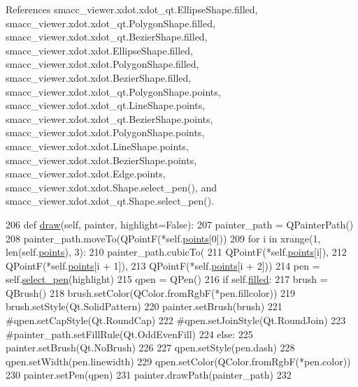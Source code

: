 References smacc\+\_\+viewer.\+xdot.\+xdot\+\_\+qt.\+Ellipse\+Shape.\+filled, smacc\+\_\+viewer.\+xdot.\+xdot\+\_\+qt.\+Polygon\+Shape.\+filled, smacc\+\_\+viewer.\+xdot.\+xdot\+\_\+qt.\+Bezier\+Shape.\+filled, smacc\+\_\+viewer.\+xdot.\+xdot.\+Ellipse\+Shape.\+filled, smacc\+\_\+viewer.\+xdot.\+xdot.\+Polygon\+Shape.\+filled, smacc\+\_\+viewer.\+xdot.\+xdot.\+Bezier\+Shape.\+filled, smacc\+\_\+viewer.\+xdot.\+xdot\+\_\+qt.\+Polygon\+Shape.\+points, smacc\+\_\+viewer.\+xdot.\+xdot\+\_\+qt.\+Line\+Shape.\+points, smacc\+\_\+viewer.\+xdot.\+xdot\+\_\+qt.\+Bezier\+Shape.\+points, smacc\+\_\+viewer.\+xdot.\+xdot.\+Polygon\+Shape.\+points, smacc\+\_\+viewer.\+xdot.\+xdot.\+Line\+Shape.\+points, smacc\+\_\+viewer.\+xdot.\+xdot.\+Bezier\+Shape.\+points, smacc\+\_\+viewer.\+xdot.\+xdot.\+Edge.\+points, smacc\+\_\+viewer.\+xdot.\+xdot.\+Shape.\+select\+\_\+pen(), and smacc\+\_\+viewer.\+xdot.\+xdot\+\_\+qt.\+Shape.\+select\+\_\+pen().


\begin{DoxyCode}
206     \textcolor{keyword}{def }\hyperlink{classsmacc__viewer_1_1xdot_1_1xdot__qt_1_1BezierShape_a19dbc35eb56d0a2fec2a74295d9a0c93}{draw}(self, painter, highlight=False):
207         painter\_path = QPainterPath()
208         painter\_path.moveTo(QPointF(*self.\hyperlink{classsmacc__viewer_1_1xdot_1_1xdot__qt_1_1BezierShape_a4f82fc0dc7fc27b2196829a68289ca37}{points}[0]))
209         \textcolor{keywordflow}{for} i \textcolor{keywordflow}{in} xrange(1, len(self.\hyperlink{classsmacc__viewer_1_1xdot_1_1xdot__qt_1_1BezierShape_a4f82fc0dc7fc27b2196829a68289ca37}{points}), 3):
210             painter\_path.cubicTo(
211                 QPointF(*self.\hyperlink{classsmacc__viewer_1_1xdot_1_1xdot__qt_1_1BezierShape_a4f82fc0dc7fc27b2196829a68289ca37}{points}[i]),
212                 QPointF(*self.\hyperlink{classsmacc__viewer_1_1xdot_1_1xdot__qt_1_1BezierShape_a4f82fc0dc7fc27b2196829a68289ca37}{points}[i + 1]),
213                 QPointF(*self.\hyperlink{classsmacc__viewer_1_1xdot_1_1xdot__qt_1_1BezierShape_a4f82fc0dc7fc27b2196829a68289ca37}{points}[i + 2]))
214         pen = self.\hyperlink{classsmacc__viewer_1_1xdot_1_1xdot__qt_1_1Shape_a7f20c9ecdb3c6117b8d1185c8155b122}{select\_pen}(highlight)
215         qpen = QPen()
216         \textcolor{keywordflow}{if} self.\hyperlink{classsmacc__viewer_1_1xdot_1_1xdot__qt_1_1BezierShape_a57fa45fe41f604d87ceabde0bb904b91}{filled}:
217             brush = QBrush()
218             brush.setColor(QColor.fromRgbF(*pen.fillcolor))
219             brush.setStyle(Qt.SolidPattern)
220             painter.setBrush(brush)
221             \textcolor{comment}{#qpen.setCapStyle(Qt.RoundCap)}
222             \textcolor{comment}{#qpen.setJoinStyle(Qt.RoundJoin)}
223             \textcolor{comment}{#painter\_path.setFillRule(Qt.OddEvenFill)}
224         \textcolor{keywordflow}{else}:
225             painter.setBrush(Qt.NoBrush)
226 
227         qpen.setStyle(pen.dash)
228         qpen.setWidth(pen.linewidth)
229         qpen.setColor(QColor.fromRgbF(*pen.color))
230         painter.setPen(qpen)
231         painter.drawPath(painter\_path)
232 
\end{DoxyCode}


